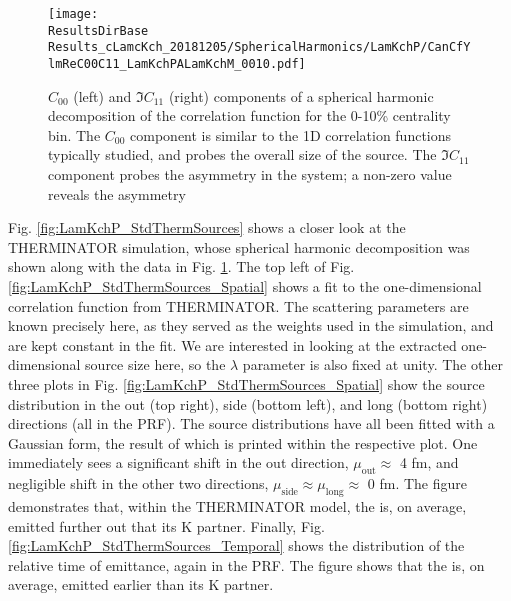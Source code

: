 \documentclass[/home/jesse/Analysis/FemtoAnalysis/AnalysisNotes/AnalysisNoteJBuxton.tex]{subfiles}
\begin{document}
\begin{figure}[h!]
  \centering
  \texttt{[image: \\ResultsDirBase Results\_cLamcKch\_20181205/SphericalHarmonics/LamKchP/CanCfYlmReC00C11\_LamKchPALamKchM\_0010.pdf]}
  \caption[\LamKchP $C_{00}$ and $\Im C_{11}$ Spherical Harmonic Components (0-10\%)]{$C_{00}$ (left) and $\Im C_{11}$ (right) components of a spherical harmonic decomposition of the \LamKchP correlation function for the 0-10\% centrality bin.  
The $C_{00}$ component is similar to the 1D correlation functions typically studied, and probes the overall size of the source.
The $\Im C_{11}$ component probes the asymmetry in the system; a non-zero value reveals the asymmetry}
  \label{fig:LamKchP_ReC00C11_0010}
\end{figure}


Fig. \ref{fig:LamKchP_StdThermSources} shows a closer look at the THERMINATOR simulation, whose spherical harmonic decomposition was shown along with the data in Fig. \ref{fig:LamKchP_ReC00C11_0010}.
The top left of Fig. \ref{fig:LamKchP_StdThermSources_Spatial} shows a fit to the one-dimensional correlation function from THERMINATOR.
The scattering parameters are known precisely here, as they served as the weights used in the simulation, and are kept constant in the fit.
We are interested in looking at the extracted one-dimensional source size here, so the $\lambda$ parameter is also fixed at unity.
The other three plots in Fig. \ref{fig:LamKchP_StdThermSources_Spatial} show the source distribution in the out (top right), side (bottom left), and long (bottom right) directions (all in the PRF).
The source distributions have all been fitted with a Gaussian form, the result of which is printed within the respective plot.
One immediately sees a significant shift in the out direction, $\mu_{\mathrm{out}} \approx$ 4 fm, and negligible shift in the other two directions, $\mu_{\mathrm{side}} \approx \mu_{\mathrm{long}} \approx$ 0 fm.
The figure demonstrates that, within the THERMINATOR model, the \Lam is, on average, emitted further out that its K partner.
Finally, Fig. \ref{fig:LamKchP_StdThermSources_Temporal} shows the distribution of the relative time of emittance, again in the PRF.
The figure shows that the \Lam is, on average, emitted earlier than its K partner.
\end{document}
